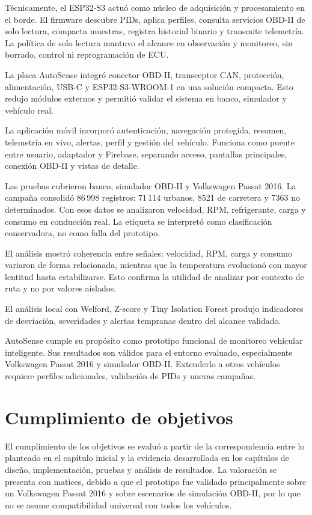 \documentclass[12pt,letterpaper]{report}
\begin{document}
Técnicamente, el ESP32-S3 actuó como núcleo de adquisición y procesamiento en el borde. El firmware descubre PIDs, aplica perfiles, consulta servicios OBD-II de solo lectura, compacta muestras, registra historial binario y transmite telemetría. La política de solo lectura mantuvo el alcance en observación y monitoreo, sin borrado, control ni reprogramación de ECU.

La placa AutoSense integró conector OBD-II, transceptor CAN, protección, alimentación, USB-C y ESP32-S3-WROOM-1 en una solución compacta. Esto redujo módulos externos y permitió validar el sistema en banco, simulador y vehículo real.

La aplicación móvil incorporó autenticación, navegación protegida, resumen, telemetría en vivo, alertas, perfil y gestión del vehículo. Funciona como puente entre usuario, adaptador y Firebase, separando acceso, pantallas principales, conexión OBD-II y vistas de detalle.

Las pruebas cubrieron banco, simulador OBD-II y Volkswagen Passat 2016. La campaña consolidó 86\,998 registros: 71\,114 urbanos, 8521 de carretera y 7363 no determinados. Con esos datos se analizaron velocidad, RPM, refrigerante, carga y consumo en conducción real. La etiqueta  se interpretó como clasificación conservadora, no como falla del prototipo.

El análisis mostró coherencia entre señales: velocidad, RPM, carga y consumo variaron de forma relacionada, mientras que la temperatura evolucionó con mayor lentitud hasta estabilizarse. Esto confirma la utilidad de analizar por contexto de ruta y no por valores aislados.

El análisis local con Welford, Z-score y Tiny Isolation Forest produjo indicadores de desviación, severidades y alertas tempranas dentro del alcance validado.

AutoSense cumple su propósito como prototipo funcional de monitoreo vehicular inteligente. Sus resultados son válidos para el entorno evaluado, especialmente Volkswagen Passat 2016 y simulador OBD-II. Extenderlo a otros vehículos requiere perfiles adicionales, validación de PIDs y nuevas campañas.

\section{Cumplimiento de objetivos}

El cumplimiento de los objetivos se evaluó a partir de la correspondencia entre lo planteado en el capítulo inicial y la evidencia desarrollada en los capítulos de diseño, implementación, pruebas y análisis de resultados. La valoración se presenta con matices, debido a que el prototipo fue validado principalmente sobre un Volkswagen Passat 2016 y sobre escenarios de simulación OBD-II, por lo que no se asume compatibilidad universal con todos los vehículos.
\end{document}
